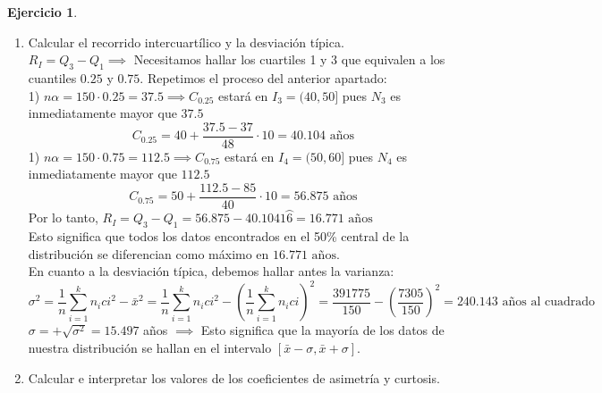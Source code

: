 \documentclass[a4paper, 12pt]{article}
\theoremstyle{definition}
\newtheorem{ej}{Ejercicio}
\begin{document}
\begin{ej}
\begin{enumerate}[label=\textit{\alph*)}]
    Lo que se nos pide es equivalente a calcular $C_{0.35}$ y $C_{0.65}$. Emplearemos la fórmula demostrada en el ejercicio 8: \\
    1) $n\alpha = 150\cdot0.35 = 52.5 \implies \ C_{0.35}$ estará en $I_{3}$ pues $N_{3}$ es inmediatamente mayor que $n\alpha \\
    C_{0.35} = 40 + \frac{52.5 - 37}{48} \cdot 10 = 43.223\wideparen{6} \text{ años (edad mínima)}$\\
    Y para el cuantil $C_{0.65}$:\\
    1) $n\alpha = 150\cdot0.65 = 97.5 \implies$ Estará en $I_{4}$ ya que $N_{4}$ es inmediatamente superior a $n\alpha$
    $$C_{0.65} = 50 + \frac{97.5 - 85}{40} \cdot 10 = 53.125 \text{ años (edad máxima)}$$
    \item Calcular el recorrido intercuartílico y la desviación típica.\\
    $R_{I} = Q_{3} - Q_{1} \implies$ Necesitamos hallar los cuartiles 1 y 3 que equivalen a los cuantiles $0.25$ y $0.75$. Repetimos el proceso del anterior apartado: \\
    1) $n\alpha = 150 \cdot 0.25 = 37.5 \implies C_{0.25}$ estará en $I_{3} = (40,50]$ pues $N_{3}$ es inmediatamente mayor que $37.5$
    $$C_{0.25} = 40 + \frac{37.5-37}{48} \cdot 10 = 40.104 \text{ años}$$
    1) $n\alpha = 150 \cdot 0.75 = 112.5 \implies C_{0.75}$ estará en $I_{4} = (50,60]$ pues $N_{4}$ es inmediatamente mayor que $112.5$
    $$C_{0.75} = 50 + \frac{112.5-85}{40} \cdot 10 = 56.875 \text{ años}$$
    Por lo tanto, $R_{I} = Q_{3} - Q_{1} = 56.875 - 40.1041\wideparen{6} = 16.771 \text{ años}$ \\
    Esto significa que todos los datos encontrados en el 50\% central de la distribución se diferencian como máximo en $16.771 \text{ años}$. \\ 
    En cuanto a la desviación típica, debemos hallar antes la varianza: 
    $$\sigma^2 = \frac{1}{n} \sum_{i = 1}^k n_{i}c{i}^2 - \bar{x}^2 = \frac{1}{n} \sum_{i = 1}^k n_{i}c{i}^2 - (\frac{1}{n} \sum_{i = 1}^k n_{i}c{i})^2 = \frac{391775}{150}- (\frac{7305}{150})^2 = 240.143 \text{ años al cuadrado}$$
    $\sigma = +\sqrt{\sigma^2} = 15.497$ años $\implies$ Esto significa que la mayoría de los datos de nuestra distribución se hallan en el intervalo $[\bar{x}-\sigma, \bar{x} + \sigma]$.
    \item Calcular e interpretar los valores de los coeficientes de asimetría y curtosis. \\
    

\end{enumerate}
\end{ej}
\end{document}
